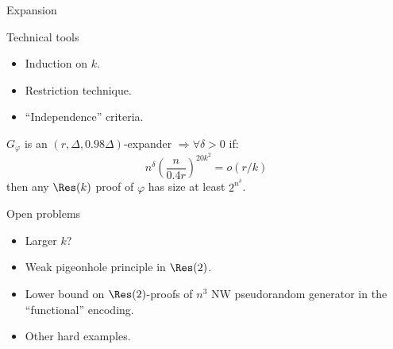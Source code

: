 \begin{frame}{Expansion}

\end{frame}


\begin{frame}{Technical tools}

    \pause
    \begin{itemize}
        \item Induction on $k$.
        \item Restriction technique.
        \item ``Independence'' criteria.
    \end{itemize}

    \pause

    \begin{theorem}
        $G_{\varphi}$ is an $(r, \Delta, 0.98 \Delta)$-expander $\Rightarrow \forall \delta > 0$ if:
        $$
            n^{\delta} \left( \frac{n}{0.4 r} \right)^{20 k^2} = o(r / k)
        $$
        then any $\Res(k)$ proof of $\varphi$ has size at least $2^{n^{\delta}}$.
    \end{theorem}

\end{frame}


\begin{frame}{Open problems}
    \pause
    \begin{itemize}
        \item Larger $k$?
            \pause
        \item Weak pigeonhole principle in $\Res(2)$.
            \pause
        \item Lower bound on $\Res(2)$-proofs of $n^3$ NW pseudorandom generator in the \alert{``functional''
            encoding}.
            \pause
        \item Other hard examples.
    \end{itemize}
\end{frame}